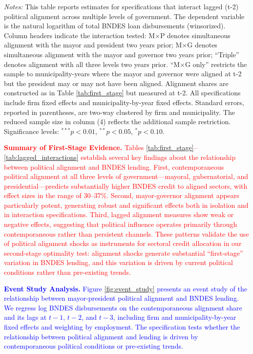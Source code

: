 \documentclass{article}
\begin{document}
\begin{table}[H]
\begin{threeparttable}
\begin{tablenotes}
            \item \textit{Notes:} This table reports estimates for specifications that interact lagged (t-2) political alignment across multiple levels of government. The dependent variable is the natural logarithm of total BNDES loan disbursements (winsorized). Column headers indicate the interaction tested: M$\times$P denotes simultaneous alignment with the mayor and president two years prior; M$\times$G denotes simultaneous alignment with the mayor and governor two years prior; ``Triple'' denotes alignment with all three levels two years prior. ``M$\times$G only'' restricts the sample to municipality-years where the mayor and governor were aligned at t-2 but the president may or may not have been aligned. Alignment shares are constructed as in Table \ref{tab:first_stage} but measured at t-2. All specifications include firm fixed effects and municipality-by-year fixed effects. Standard errors, reported in parentheses, are two-way clustered by firm and municipality. The reduced sample size in column (4) reflects the additional sample restriction. Significance levels: $^{***}p<0.01$, $^{**}p<0.05$, $^{*}p<0.10$.
        \end{tablenotes}
    \end{threeparttable}
\end{table}

\textcolor{red}{\textbf{Summary of First-Stage Evidence.} Tables \ref{tab:first_stage}--\ref{tab:lagged_interactions} establish several key findings about the relationship between political alignment and BNDES lending. First, contemporaneous political alignment at all three levels of government---mayoral, gubernatorial, and presidential---predicts substantially higher BNDES credit to aligned sectors, with effect sizes in the range of 30--37\%. Second, mayor-governor alignment appears particularly potent, generating robust and significant effects both in isolation and in interaction specifications. Third, lagged alignment measures show weak or negative effects, suggesting that political influence operates primarily through contemporaneous rather than persistent channels. These patterns validate the use of political alignment shocks as instruments for sectoral credit allocation in our second-stage optimality test: alignment shocks generate substantial ``first-stage'' variation in BNDES lending, and this variation is driven by current political conditions rather than pre-existing trends.}


\textcolor{blue}{\textbf{Event Study Analysis.} Figure \ref{fig:event_study} presents an event study of the relationship between mayor-president political alignment and BNDES lending. We regress log BNDES disbursements on the contemporaneous alignment share and its lags at $t-1$, $t-2$, and $t-3$, including firm and municipality-by-year fixed effects and weighting by employment. The specification tests whether the relationship between political alignment and lending is driven by contemporaneous political conditions or pre-existing trends.}
\end{document}
